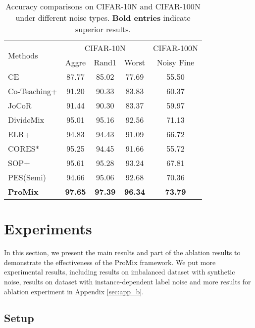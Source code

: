 \documentclass{article}
\begin{document}
\begin{table}[!t]
    \centering
    \small
    \begin{tabular}{l|ccc|c}
        \toprule
        \multirow{2}{*}{Methods}  & \multicolumn{3}{c|}{CIFAR-10N} &
        \multicolumn{1}{c}{CIFAR-100N} \\
        \cmidrule{2-5}
        & Aggre & Rand1  & Worst & Noisy Fine\\
        \midrule
        CE      & 87.77	  & 85.02  & 77.69  & 55.50\\ 
        Co-Teaching+    & 91.20	  & 90.33  & 83.83  & 60.37\\ 
        JoCoR   & 91.44	  & 90.30  & 83.37  & 59.97\\ 
        DivideMix   & 95.01	  & 95.16  & 92.56  & 71.13\\ 
        ELR+    & 94.83	  & 94.43  & 91.09  & 66.72\\ 
        CORES*  & 95.25	  & 94.45  & 91.66  & 55.72\\ 
        SOP+     & 95.61	  & 95.28  & 93.24  & 67.81\\ 
        PES(Semi)     & 94.66	  & 95.06  & 92.68  & 70.36\\ \midrule
        \textbf{ProMix}    & \textbf{97.65}	  & \textbf{97.39}  & \textbf{96.34}  & \textbf{73.79}\\
        \bottomrule
    \end{tabular}
    \caption{Accuracy comparisons on CIFAR-10N and CIFAR-100N under different noise types. \textbf{Bold entries} indicate superior results. }
    \label{tab:cifarn}
\end{table}

\section{Experiments}
In this section, we present the main results and part of the ablation results to demonstrate the effectiveness of the ProMix framework. We put more experimental results, including results on imbalanced dataset with synthetic noise, results on dataset with instance-dependent label noise and more results for ablation experiment in Appendix \ref{sec:app_b}.
\subsection{Setup}
\end{document}
